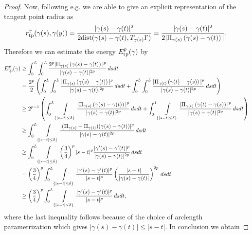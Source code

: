\documentclass{article}
\begin{document}
\begin{proof}
    Now, following e.g. \cite{blatt_regularity_2012} we are able to give an explicit representation of the tangent point radius as
    \begin{align}\label{eq:repradius}
        r_{\rm tp}^{\gamma}(\gamma(s), \gamma(y)) = \frac{|\gamma(s) - \gamma(t)|^2}{2{\rm dist}(\gamma(s)-\gamma(t), T_{\gamma(s)}\Gamma)} = \frac{|\gamma(s) - \gamma(t)|^2}{2|\Pi_{\gamma(s)}\left( \gamma(s) - \gamma(t)\right)|}.
    \end{align}
    Therefore we can estimate the energy $E_{\rm tp}^p(\gamma)$ by
    \begin{align}
        E^p_{\rm tp}(\gamma) &\geq \int_0^L \int_0^L \frac{2^{p}|\Pi_{\gamma(s)}\left( \gamma(s) - \gamma(t)\right)|^{p}}{|\gamma(s) - \gamma(t)|^{2p}} \, ds dt \nonumber\\
        &= \frac{2^p}{2}\left(\int_0^L \int_0^L \frac{|\Pi_{\gamma(s)}\left( \gamma(s) - \gamma(t)\right)|^{p}}{|\gamma(s) - \gamma(t)|^{2p}} \, ds dt + \int_0^L \int_0^L \frac{|\Pi_{\gamma(t)}\left( \gamma(t) - \gamma(s)\right)|^{p}}{|\gamma(s) - \gamma(t)|^{2p}} \, ds dt \right)  \nonumber\\
        &\geq 2^{p-1}\left(\int_0^L \int\limits_{\{|s-t|\leq\delta\}} \frac{|\Pi_{\gamma(s)}\left( \gamma(s) - \gamma(t)\right)|^{p}}{|\gamma(s) - \gamma(t)|^{2p}} \, ds dt + \int_0^1 \int\limits_{\{|s-t|\leq\delta\}} \frac{|\Pi_{\gamma(t)}\left( \gamma(t) - \gamma(s)\right)|^{p}}{|\gamma(s) - \gamma(t)|^{2p}} \, ds dt \right)  \nonumber\\
        &\geq \int_0^L \int\limits_{\{|s-t|\leq\delta\}} \frac{|(\Pi_{\gamma(s)} - \Pi_{\gamma(t)})(\gamma(s) - \gamma(t))|^p}{|\gamma(s) - \gamma(t)|^{2p}}\, ds dt  \nonumber\\
        &\geq \int_0^L \int\limits_{\{|s-t|\leq\delta\}} \left( \frac{3}{4} \right)^p |s-t|^p \frac{|\gamma'(s) - \gamma'(t)|^p}{|\gamma(s) - \gamma(t)|^{2p}}\, ds dt  \nonumber\\
        &= \left( \frac{3}{4} \right)^p \int_0^L \int\limits_{\{|s-t|\leq\delta\}} \frac{|\gamma'(s) - \gamma'(t)|^p}{|s-t|^{p}} \left( \frac{|s-t|}{|\gamma(s) - \gamma(t)|} \right)^{2p}\, ds dt  \nonumber\\
        &\geq  \left( \frac{3}{4} \right)^p\int_0^L \int\limits_{\{|s-t|\leq\delta\}} \frac{|\gamma'(s) - \gamma'(t)|^p}{|s-t|^{p}}\, ds dt, \label{eq:estdelta}
    \end{align}
    where the last inequality follows because of the choice of arclength parametrization which gives $|\gamma(s) - \gamma(t)| \leq |s-t|$.
    In conclusion we obtain 

\end{proof}
\end{document}
